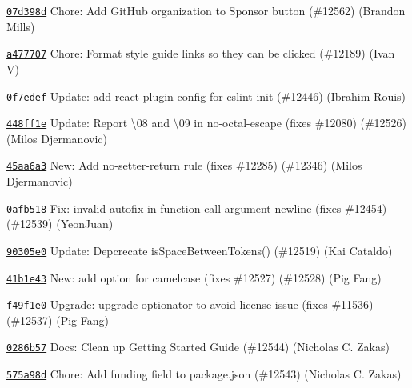 \begin{DoxyItemize}
\item \href{https://github.com/eslint/eslint/commit/07d398d91d5b6d0247e58b1f8ea64bb5acd570a8}{\texttt{ {\ttfamily 07d398d}}} Chore\+: Add Git\+Hub organization to Sponsor button (\#12562) (Brandon Mills)
\item \href{https://github.com/eslint/eslint/commit/a47770706ac59633dcd73e886d1a7282b324ee06}{\texttt{ {\ttfamily a477707}}} Chore\+: Format style guide links so they can be clicked (\#12189) (Ivan V)
\item \href{https://github.com/eslint/eslint/commit/0f7edefdc1576d5e3e7ef89083002b0a4a31f039}{\texttt{ {\ttfamily 0f7edef}}} Update\+: add react plugin config for eslint init (\#12446) (Ibrahim Rouis)
\item \href{https://github.com/eslint/eslint/commit/448ff1e53734c503fb9e7e6802c1c7e441d4c019}{\texttt{ {\ttfamily 448ff1e}}} Update\+: Report \textquotesingle{}\textbackslash{}08\textquotesingle{} and \textquotesingle{}\textbackslash{}09\textquotesingle{} in no-\/octal-\/escape (fixes \#12080) (\#12526) (Milos Djermanovic)
\item \href{https://github.com/eslint/eslint/commit/45aa6a3ba3486f1b116c5daab6432d144e5ea574}{\texttt{ {\ttfamily 45aa6a3}}} New\+: Add no-\/setter-\/return rule (fixes \#12285) (\#12346) (Milos Djermanovic)
\item \href{https://github.com/eslint/eslint/commit/0afb518d1f139376245613dddd8eaef32b52d619}{\texttt{ {\ttfamily 0afb518}}} Fix\+: invalid autofix in function-\/call-\/argument-\/newline (fixes \#12454) (\#12539) (Yeon\+Juan)
\item \href{https://github.com/eslint/eslint/commit/90305e017c2c5fba0b4b62f41b180910b4baeedb}{\texttt{ {\ttfamily 90305e0}}} Update\+: Depcrecate is\+Space\+Between\+Tokens() (\#12519) (Kai Cataldo)
\item \href{https://github.com/eslint/eslint/commit/41b1e4308c1cb01c8b00cc8adc36440e77854117}{\texttt{ {\ttfamily 41b1e43}}} New\+: add option for camelcase (fixes \#12527) (\#12528) (Pig Fang)
\item \href{https://github.com/eslint/eslint/commit/f49f1e0a69afa49f6548af7b2c0e6347e1ea022d}{\texttt{ {\ttfamily f49f1e0}}} Upgrade\+: upgrade optionator to avoid license issue (fixes \#11536) (\#12537) (Pig Fang)
\item \href{https://github.com/eslint/eslint/commit/0286b5730501b391c74e069db46849f0de0885d2}{\texttt{ {\ttfamily 0286b57}}} Docs\+: Clean up Getting Started Guide (\#12544) (Nicholas C. Zakas)
\item \href{https://github.com/eslint/eslint/commit/575a98d724b2688f1e9c83744c5dc9ffe9a7bfb4}{\texttt{ {\ttfamily 575a98d}}} Chore\+: Add funding field to package.\+json (\#12543) (Nicholas C. Zakas)

\end{DoxyItemize}

